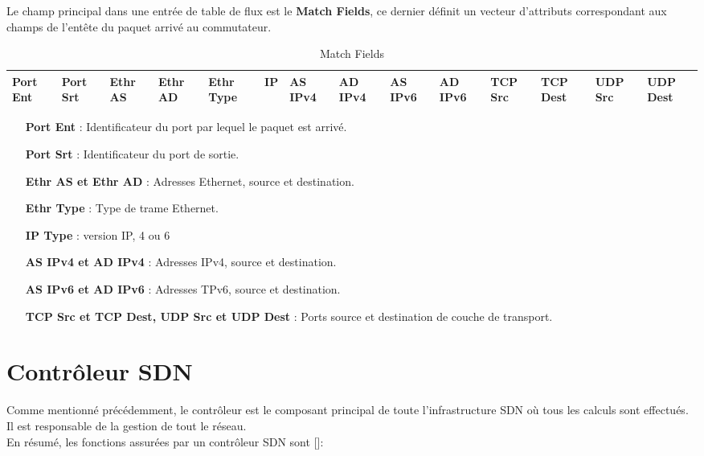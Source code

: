 Le champ principal dans une entrée de table de flux est le \textbf{Match Fields}, ce dernier définit un vecteur d'attributs correspondant aux champs de l’entête du paquet arrivé au commutateur.\\

\begin{table}[h]
\begin{center}
\begin{tabular}{ | m{0.7cm} | m{0.7cm} | m{0.7cm} | m{0.7cm} | m{0.7cm} | m{0.7cm} | m{0.7cm} | m{0.7cm} | m{0.7cm} | m{0.7cm} | m{0.7cm} | m{0.7cm} | m{0.7cm} | m{0.7cm} |}
\hline
\rowcolor[rgb]{0.80,0.80,0.80}
 Port Ent & Port Srt & Ethr AS & Ethr AD & Ethr Type & IP & AS IPv4 & AD IPv4 & AS IPv6 & AD IPv6 & TCP Src & TCP Dest & UDP Src & UDP Dest\\
\hline
\end{tabular}
\caption{Match Fields}
\end{center}
\end{table}

\begin{itemize}
\item[\textbf{Port Ent}]: Identificateur du port par lequel le paquet est arrivé.
\item[\textbf{Port Srt}]: Identificateur du port de sortie.
\item[\textbf{Ethr AS et Ethr AD}]: Adresses Ethernet, source et destination. 
\item[\textbf{Ethr Type}]: Type de trame Ethernet.
\item[\textbf{IP Type}]: version IP, 4 ou 6
\item[\textbf{AS IPv4 et AD IPv4}]: Adresses IPv4, source et destination.
\item[\textbf{AS IPv6 et AD IPv6}]: Adresses TPv6, source et destination.
\item[\textbf{TCP Src et TCP Dest, UDP Src et UDP Dest}]: Ports source et destination de couche de transport.
\end{itemize}

\newpage
\section{Contrôleur SDN}
Comme mentionné précédemment, le contrôleur est le composant principal de toute l'infrastructure SDN où tous les calculs sont effectués. Il est responsable de la gestion de tout le réseau.\\
En résumé, les fonctions assurées par un contrôleur SDN sont [\cite{6}]: \\

